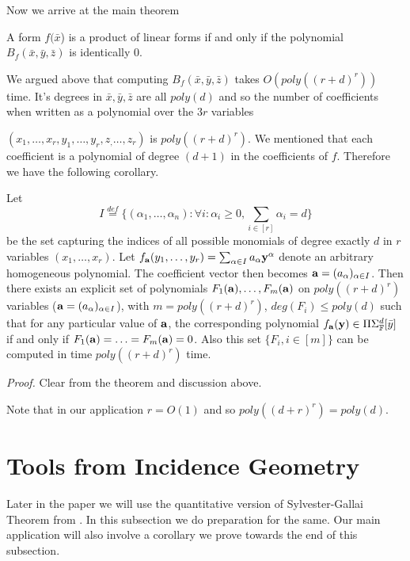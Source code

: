 \documentclass[letterpaper,USenglish,numberwithinsect]{lipics}
\newcommand{\eqdef}{\stackrel{def}{=}}
\newcommand{\F}{\mathbb{F}}
\newcommand{\B}[1]{\bar{#1}}
\begin{document}
Now we arrive at the main theorem
\begin{theorem}
 A form $f(\B{x}$) is a product of linear forms if and only if the polynomial $B_f(\B{x},\B{y},\B{z})$ is identically $0$.
\end{theorem}

We argued above that computing $B_f(\B{x},\B{y},\B{z})$ takes $O(poly((r+d)^r))$ time. It's degrees
in $\B{x},\B{y},\B{z}$ are all $poly(d)$ and so the number of coefficients when written as a polynomial over the $3r$ variables

$(x_1,\ldots,x_r,y_1,\ldots,y_r,z_,\ldots,z_r)$ is $poly((r+d)^r)$. We mentioned that each coefficient is a polynomial
of degree $(d+1)$ in the coefficients of $f$. Therefore we have the following corollary.

\begin{corollary}\label{variety}
 Let
\[
 I\eqdef \{(\alpha_1,\ldots,\alpha_n) : \forall i : \alpha_i\geq 0,
 \sum\limits_{i\in[r]}\alpha_i=d\}
 \]
be the set capturing the indices of all possible monomials of degree exactly $d$
in $r$ variables $(x_1,\ldots,x_r)$. Let
$f_{\bf a}(y_1,\ldots,y_r) = \sum_{\alpha\in I}a_{\alpha}{\bf y}^{\alpha}$
denote an arbitrary homogeneous polynomial. The coefficient vector then
becomes ${\bf a }= (a_\alpha)_{\alpha\in I}$.
Then there exists an explicit set of polynomials $F_1({\bf a}),\ldots,F_m({\bf
a})$ on $poly((r+d)^r)$ variables (${\bf a} = (a_\alpha)_{\alpha\in I}$), with $m=poly((r+d)^r)$,  $deg(F_i)\leq poly(d)$ such that for any
particular value of ${\bf a}$, the corresponding polynomial $f_{\bf a}({\bf
y})\in \Pi\Sigma_\F^{d}[\B{y}]$  if and only if $F_1({\bf a})=\ldots=F_m({\bf
a})=0$. Also this set $\{F_i, i\in [m]\}$ can be computed in time $poly((r+d)^r)$ time.
\end{corollary}
\emph{Proof.}
 Clear from the theorem and discussion above.


Note that in our application $r=O(1)$ and so $poly((d+r)^r) = poly(d)$.


\section{Tools from Incidence Geometry}\label{incidence}

Later in the paper we will use the quantitative version of Sylvester-Gallai Theorem from \cite{BDWY11}. In this subsection we do preparation
for the same. Our main application will also involve a corollary we prove towards the end of this subsection.
\end{document}
